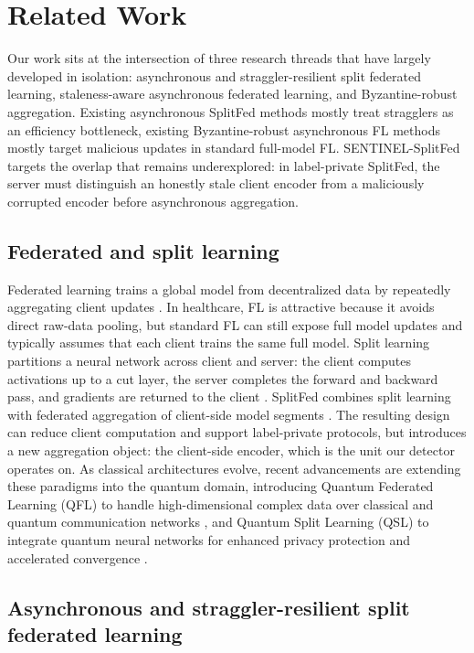 \documentclass[pdflatex,sn-mathphys-num]{sn-jnl}
\begin{document}
\section{Related Work}\label{sec:related}

Our work sits at the intersection of three research threads that have largely developed in isolation: asynchronous and straggler-resilient split federated learning, staleness-aware asynchronous federated learning, and Byzantine-robust aggregation. Existing asynchronous SplitFed methods mostly treat stragglers as an efficiency bottleneck, existing Byzantine-robust asynchronous FL methods mostly target malicious updates in standard full-model FL. SENTINEL-SplitFed targets the overlap that remains underexplored: in label-private SplitFed, the server must distinguish an honestly stale client encoder from a maliciously corrupted encoder before asynchronous aggregation.

\subsection{Federated and split learning}

Federated learning trains a global model from decentralized data by repeatedly aggregating client updates \cite{mcmahan2017communication}. In healthcare, FL is attractive because it avoids direct raw-data pooling, but standard FL can still expose full model updates and typically assumes that each client trains the same full model. Split learning partitions a neural network across client and server: the client computes activations up to a cut layer, the server completes the forward and backward pass, and gradients are returned to the client \cite{vepakomma2018split}. SplitFed combines split learning with federated aggregation of client-side model segments \cite{thapa2022splitfed}. The resulting design can reduce client computation and support label-private protocols, but introduces a new aggregation object: the client-side encoder, which is the unit our detector operates on. As classical architectures evolve, recent advancements are extending these paradigms into the quantum domain, introducing Quantum Federated Learning (QFL) to handle high-dimensional complex data over classical and quantum communication networks \cite{chehimi2024foundations}, and Quantum Split Learning (QSL) to integrate quantum neural networks for enhanced privacy protection and accelerated convergence \cite{yun2022quantum}.


\subsection{Asynchronous and straggler-resilient split federated learning}
\end{document}

